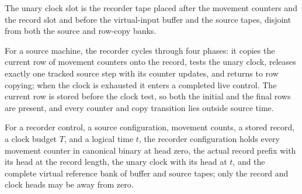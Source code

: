 \begin{definition}
\label{Complexity.clRecClockIndex}
\leanok
{}
The unary clock slot is the recorder tape placed after the movement counters and the record slot and before the virtual-input buffer and the source tapes, disjoint from both the source and row-copy banks.
\end{definition}

\begin{definition}
\label{Complexity.clRecTM}
\leanok
{}
For a source machine, the recorder cycles through four phases: it copies the current row of movement counters onto the record, tests the unary clock, releases exactly one tracked source step with its counter updates, and returns to row copying; when the clock is exhausted it enters a completed live control. The current row is stored before the clock test, so both the initial and the final rows are present, and every counter and copy transition lies outside source time.
\end{definition}

\begin{definition}
\label{Complexity.clRecCfg}
\leanok
{}
For a recorder control, a source configuration, movement counts, a stored record, a clock budget $T$, and a logical time $t$, the recorder configuration holds every movement counter in canonical binary at head zero, the actual record prefix with its head at the record length, the unary clock with its head at $t$, and the complete virtual reference bank of buffer and source tapes; only the record and clock heads may be away from zero.
\end{definition}

